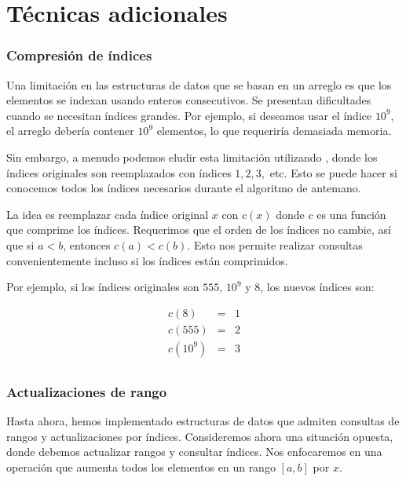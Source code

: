 \section{Técnicas adicionales}

\subsubsection{Compresión de índices}

Una limitación en las estructuras de datos que
se basan en un arreglo es que
los elementos se indexan usando
enteros consecutivos.
Se presentan dificultades cuando se necesitan índices grandes.
Por ejemplo, si deseamos usar el índice $10^9$,
el arreglo debería contener $10^9$
elementos, lo que requeriría demasiada memoria.


Sin embargo, a menudo podemos eludir esta limitación
utilizando ,
donde los índices originales son reemplazados
con índices $1,2,3,$ etc.
Esto se puede hacer si conocemos todos los índices
necesarios durante el algoritmo de antemano.

La idea es reemplazar cada índice original $x$
con $c(x)$ donde $c$ es una función que
comprime los índices.
Requerimos que el orden de los índices
no cambie, así que si $a<b$, entonces $c(a)<c(b)$.
Esto nos permite realizar consultas convenientemente
incluso si los índices están comprimidos.

Por ejemplo, si los índices originales son
$555$, $10^9$ y $8$, los nuevos índices son:

\[
    \begin{array}{lcl}
        c(8)    & = & 1 \\
        c(555)  & = & 2 \\
        c(10^9) & = & 3 \\
    \end{array}
\]

\subsubsection{Actualizaciones de rango}

Hasta ahora, hemos implementado estructuras de datos
que admiten consultas de rangos y actualizaciones
por índices. Consideremos ahora una situación opuesta,
donde debemos actualizar rangos y consultar índices.
Nos enfocaremos en una operación que aumenta todos
los elementos en un rango $[a,b]$ por $x$.

